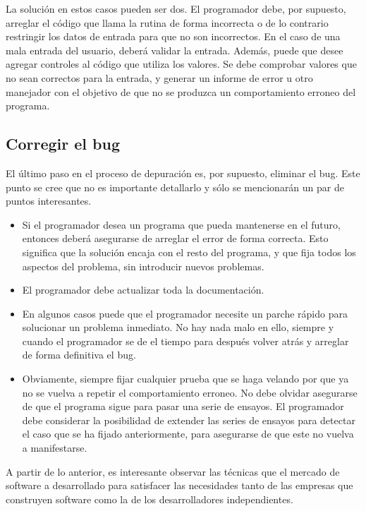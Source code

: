 \documentclass[12pt,a4paper]{report}
\begin{document}
La solución en estos casos pueden ser dos. El programador debe, por supuesto, arreglar el código que llama la rutina de forma incorrecta o de lo contrario restringir los datos de entrada para que no son incorrectos. En el caso de una mala entrada del usuario, deberá validar la entrada. Además, puede que desee agregar controles al código que utiliza los valores.  Se debe comprobar valores que no sean correctos para la entrada, y generar un informe de error u otro manejador con el objetivo de que no se produzca un comportamiento erroneo del programa.


\subsection{Corregir el bug}

El último paso en el proceso de depuración es, por supuesto, eliminar el bug. Este punto se cree que no es importante detallarlo y sólo se mencionarán un par de puntos interesantes.

\begin{itemize}
    \item Si el programador desea un programa que pueda mantenerse en el futuro, entonces deberá asegurarse de arreglar el error de forma correcta. Esto significa que la solución encaja con el resto del programa, y que fija todos los aspectos del problema, sin introducir nuevos problemas. 

    \item El programador debe actualizar toda la documentación. 

    \item En algunos casos puede que el programador necesite un parche rápido para solucionar un problema inmediato. No hay nada malo en ello, siempre y cuando el programador se de el tiempo para después volver atrás y arreglar de forma definitiva el bug. 

    \item Obviamente, siempre fijar cualquier prueba que se haga velando por que ya no se vuelva a repetir el comportamiento erroneo. No debe olvidar asegurarse de que el programa sigue para pasar una serie de ensayos. El programador debe considerar la posibilidad de extender las series de ensayos para detectar el caso que se ha fijado anteriormente, para asegurarse de que este no vuelva a manifestarse.
\end{itemize}

A partir de lo anterior, es interesante observar las técnicas que el mercado de software a desarrollado para satisfacer las necesidades tanto de las empresas que construyen software como la de los desarrolladores independientes.
\end{document}
